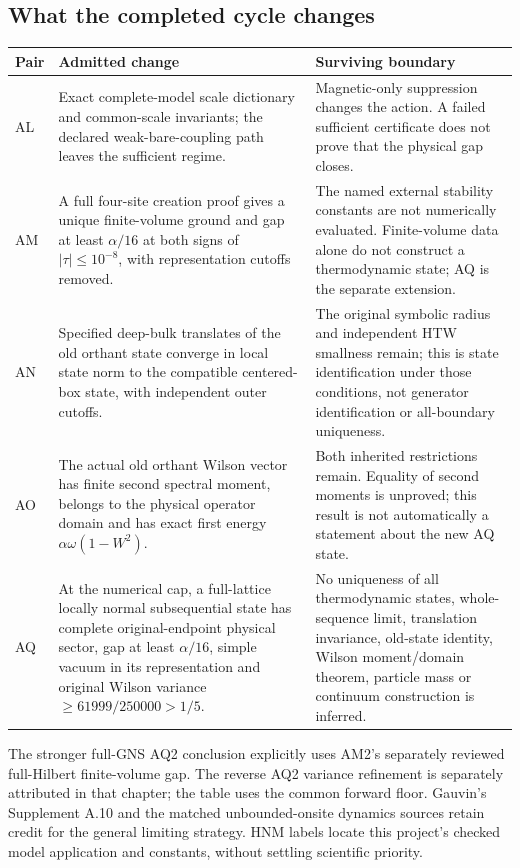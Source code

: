 \subsection{What the completed cycle changes}
\begin{longtable}{@{}p{17mm}p{69mm}p{64mm}@{}}
\toprule Pair & Admitted change & Surviving boundary\\\midrule\endhead
AL & Exact complete-model scale dictionary and common-scale invariants; the declared weak-bare-coupling path leaves the sufficient regime. & Magnetic-only suppression changes the action. A failed sufficient certificate does not prove that the physical gap closes.\\\addlinespace
AM & A full four-site creation proof gives a unique finite-volume ground and gap at least $\alpha/16$ at both signs of $|\tau|\le10^{-8}$, with representation cutoffs removed. & The named external stability constants are not numerically evaluated. Finite-volume data alone do not construct a thermodynamic state; AQ is the separate extension.\\\addlinespace
AN & Specified deep-bulk translates of the old orthant state converge in local state norm to the compatible centered-box state, with independent outer cutoffs. & The original symbolic radius and independent HTW smallness remain; this is state identification under those conditions, not generator identification or all-boundary uniqueness.\\\addlinespace
AO & The actual old orthant Wilson vector has finite second spectral moment, belongs to the physical operator domain and has exact first energy $\alpha\omega(1-W^2)$. & Both inherited restrictions remain. Equality of second moments is unproved; this result is not automatically a statement about the new AQ state.\\\addlinespace
AQ & At the numerical cap, a full-lattice locally normal subsequential state has complete original-endpoint physical sector, gap at least $\alpha/16$, simple vacuum in its representation and original Wilson variance $\ge61999/250000>1/5$. & No uniqueness of all thermodynamic states, whole-sequence limit, translation invariance, old-state identity, Wilson moment/domain theorem, particle mass or continuum construction is inferred.\\\bottomrule
\end{longtable}

The stronger full-GNS AQ2 conclusion explicitly uses AM2's separately reviewed full-Hilbert finite-volume gap. The reverse AQ2 variance refinement is separately attributed in that chapter; the table uses the common forward floor. Gauvin's Supplement A.10 and the matched unbounded-onsite dynamics sources retain credit for the general limiting strategy. HNM labels locate this project's checked model application and constants, without settling scientific priority.

